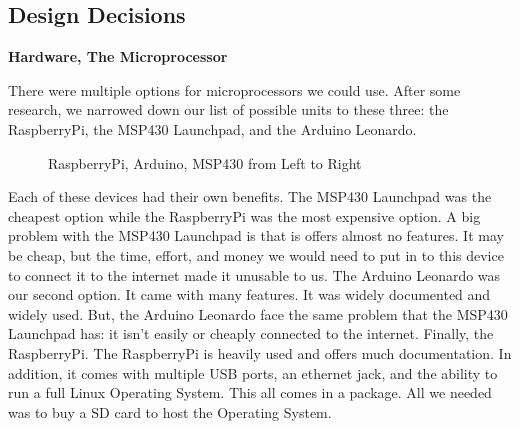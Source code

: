 \documentclass{report}
\begin{document}
\subsection*{Design Decisions}
\begin{center}
	\textbf{Hardware, The Microprocessor}
\end{center}
\indent
\indent
There were multiple options for microprocessors we could use. After some research, we narrowed down our list of possible units to these three: the RaspberryPi, the MSP430 Launchpad, and the Arduino Leonardo.
\newline
\begin{figure}[H]
	\caption{RaspberryPi, Arduino, MSP430 from Left to Right}
\end{figure}
\indent
Each of these devices had their own benefits. The MSP430 Launchpad was the cheapest option while the RaspberryPi was the most expensive option. A big problem with the MSP430 Launchpad is that is offers almost no features. It may be cheap, but the time, effort, and money we would need to put in to this device to connect it to the internet made it unusable to us.
\newline
\indent
The Arduino Leonardo was our second option. It came with many features. It was widely documented and widely used. But, the Arduino Leonardo face the same problem that the MSP430 Launchpad has: it isn't easily or cheaply connected to the internet.
\newline
\indent
Finally, the RaspberryPi. The RaspberryPi is heavily used and offers much documentation. In addition, it comes with multiple USB ports, an ethernet jack, and the ability to run a full Linux Operating System. This all comes in a  package. All we needed was to buy a  SD card to host the Operating System.
\newpage
\end{document}
